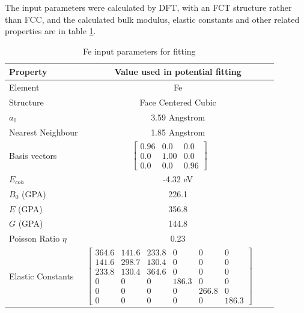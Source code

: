 The input parameters were calculated by DFT, with an FCT structure rather than FCC, and the calculated bulk modulus, elastic constants and other related properties are in table \ref{table:feinputparameters}.

\begin{table}[ht]
\renewcommand{\arraystretch}{1.2}
\begin{tabular}{lccc}
\hline\hline
Property & \multicolumn{3}{c}{Value used in potential fitting} \\
\hline\hline
Element & \multicolumn{3}{c}{Fe}\\
Structure             & \multicolumn{3}{c}{Face Centered Cubic}\\
$a_0$                 & \multicolumn{3}{c}{3.59 Angstrom}\\
Nearest Neighbour     & \multicolumn{3}{c}{1.85 Angstrom}\\
Basis vectors         & $\begin{bmatrix} 0.96 & 0.0 & 0.0 \\ 0.0 & 1.00 & 0.0 \\ 0.0 & 0.0 & 0.96  \end{bmatrix}$ \\
$E_{coh}$             & \multicolumn{3}{c}{-4.32 eV}   \\
$B_0$ (GPA)           & \multicolumn{3}{c}{226.1}   \\
$E$ (GPA)             & \multicolumn{3}{c}{356.8}   \\
$G$ (GPA)             & \multicolumn{3}{c}{144.8}   \\
Poisson Ratio $\eta$  & \multicolumn{3}{c}{0.23}   \\
Elastic Constants     & $\begin{bmatrix} 364.6 & 141.6 & 233.8 & 0 & 0 & 0 \\ 141.6 & 298.7 & 130.4 & 0 & 0 & 0 \\ 233.8 & 130.4 & 364.6 & 0 & 0 & 0 \\ 0 & 0 & 0 & 186.3 & 0 & 0 \\ 0 & 0 & 0 & 0 & 266.8 & 0 \\ 0 & 0 & 0 & 0 & 0 & 186.3 \end{bmatrix}$ \\
\hline\hline
\end{tabular}
\caption{Fe input parameters for fitting}
\label{table:feinputparameters}
\end{table}

\FloatBarrier



